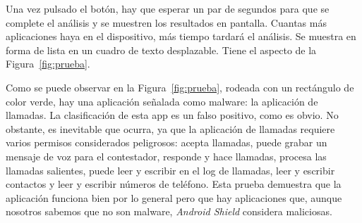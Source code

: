 Una vez pulsado el botón, hay que esperar un par de segundos para que se complete el análisis y se muestren los resultados en pantalla. Cuantas más aplicaciones haya en el dispositivo, más tiempo tardará el análisis. Se muestra en forma de lista en un cuadro de texto desplazable. Tiene el aspecto de la Figura~\ref{fig:prueba}.

Como se puede observar en la Figura~\ref{fig:prueba}, rodeada con un rectángulo de color verde, hay una aplicación señalada como malware: la aplicación de llamadas. La clasificación de esta app es un falso positivo, como es obvio. No obstante, es inevitable que ocurra, ya que la aplicación de llamadas requiere varios permisos considerados peligrosos: acepta llamadas, puede grabar un mensaje de voz para el contestador, responde y hace llamadas, procesa las llamadas salientes, puede leer y escribir en el log de llamadas, leer y escribir contactos y leer y escribir números de teléfono. Esta prueba demuestra que la aplicación funciona bien por lo general pero que hay aplicaciones que, aunque nosotros sabemos que no son malware, \textit{Android Shield} considera maliciosas.

